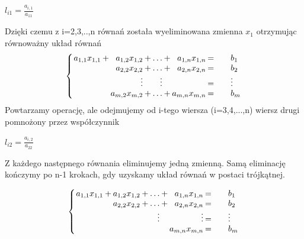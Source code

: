 \documentclass{article}
\begin{document}
\begin{center}
    \begin{math}
        l_{i1} = \frac{a_{i,1}}{a_{11}}
    \end{math}
\end{center}
Dzięki czemu z  i=2,3,..,n równań została wyeliminowana zmienna \begin{math}x_{1} \end{math} otrzymując równoważny układ równań
\[
\setlength\arraycolsep{1pt}
\left\{
\begin{array}{rcrcrcrc@{\qquad}l}
a_{1,1}x_{1,1}  & +  &    a_{1,2}x_{1,2}    & + &   \ldots      & + &   a_{1,n}x_{1,n} &   =   &    b_{1} \\
                &    &   a_{2,2}x_{2,2}     & + &   \ldots      & + &   a_{2,n}x_{2,n} &   =   &    b_{2} \\
                &    &   \vdots             &   &   \vdots      &   &                  &   =   &    \vdots \\             
                &    &   a_{m,2}x_{m,2}     & + &   \ldots      & + &   a_{m,n}x_{m,n} &   =   &    b_{m} \\
\end{array}
\right.
\]
Powtarzamy operację, ale odejmujemy od i-tego
wiersza (i=3,4,...,n) wiersz drugi pomnożony przez
współczynnik
\begin{center}
    \begin{math}
        l_{i2} = \frac{a_{i,2}}{a_{22}}
    \end{math}
\end{center}
\newpage
Z każdego następnego równania eliminujemy jedną zmienną. Samą eliminację kończymy po n-1 krokach, gdy uzyskamy układ równań w postaci trójkątnej.
\begin{center}

\[
\setlength\arraycolsep{1pt}
\left\{
\begin{array}{rcrcrcrc@{\qquad}l}
a_{1,1}x_{1,1}  & +  &    a_{1,2}x_{1,2}    & + &   \ldots      & + &   a_{1,n}x_{1,n} &   =   &    b_{1} \\
                &    &   a_{2,2}x_{2,2}     & + &   \ldots      & + &   a_{2,n}x_{2,n} &   =   &    b_{2} \\
                &    &                      &   &   \vdots      &   &         \vdots   &   =   &    \vdots \\             
                &    &                      &   &               &   &   a_{m,n}x_{m,n} &   =   &    b_{m} \\
\end{array}
\right.
\]
\end{center}
\end{document}

